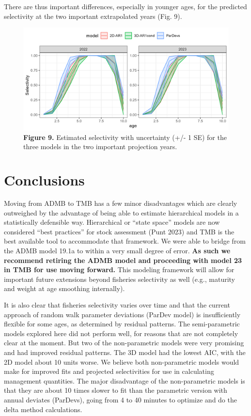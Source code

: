 \documentclass[
]{article}
\begin{document}
{{{There are thus important differences, especially in younger ages, for
the predicted selectivity at the two important extrapolated years (Fig.
9).

\begin{figure}
\hypertarget{fig:figure9}{%
\centering
\includegraphics{Results/Figure9_selectivity_at_age_projections.png}
\caption{\textbf{Figure 9.} Estimated selectivity with uncertainty (+/-
1 SE) for the three models in the two important projection
years.}\label{fig:figure9}
}
\end{figure}

\hypertarget{conclusions}{%
\section{Conclusions}\label{conclusions}}

Moving from ADMB to TMB has a few minor disadvantages which are clearly
outweighed by the advantage of being able to estimate hierarchical
models in a statistically defensible way. Hierarchical or ``state
space'' models are now considered ``best practices'' for stock
assessment (Punt 2023) and TMB is the best available tool to accommodate
that framework. We were able to bridge from the ADMB model 19.1a to
within a very small degree of error. \textbf{As such we recommend
retiring the ADMB model and proceeding with model 23 in TMB for use
moving forward. } This modeling framework will allow for important
future extensions beyond fisheries selectivity as well (e.g., maturity
and weight at age smoothing internally).

It is also clear that fisheries selectivity varies over time and that
the current approach of random walk parameter deviations (ParDev model)
is insufficiently flexible for some ages, as determined by residual
patterns. The semi-parametric models explored here did not perform well,
for reasons that are not completely clear at the moment. But two of the
non-parametric models were very promising and had improved residual
patterns. The 3D model had the lowest AIC, with the 2D model about 10
units worse. We believe both non-parametric models would make for
improved fits and projected selectivities for use in calculating
management quantities. The major disadvantage of the non-parametric
models is that they are about 10 times slower to fit than the parametric
version with annual deviates (ParDevs), going from 4 to 40 minutes to
optimize and do the delta method calculations.

}}}
\end{document}
